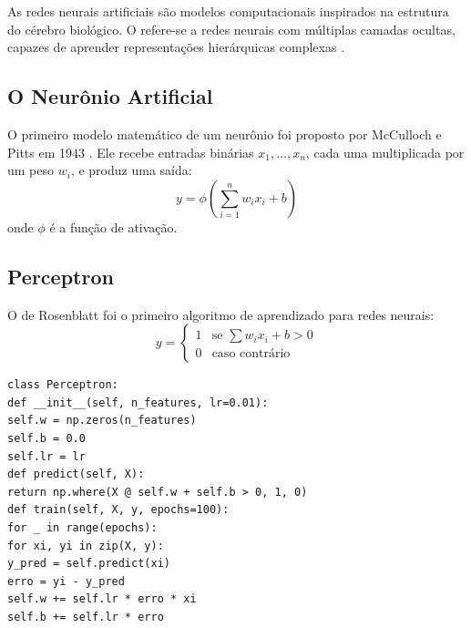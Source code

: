 As redes neurais artificiais são modelos computacionais inspirados na
estrutura do cérebro biológico. O  refere-se a
redes neurais com múltiplas camadas ocultas, capazes de aprender
representações hierárquicas complexas \cite{goodfellow2016deep,
lecun2015deep}.
\subsection{O Neurônio Artificial}
\begin{definicao}
O primeiro modelo matemático de um neurônio foi proposto por McCulloch e
Pitts em 1943 \cite{mcculloch1943logical}. Ele recebe entradas binárias
$x_1, \ldots, x_n$, cada uma multiplicada por um peso $w_i$, e produz uma
saída:
\[y = \phi\left(\sum_{i=1}^n w_i x_i + b\right)
\]
onde $\phi$ é a função de ativação.
\end{definicao}
\subsection{Perceptron}
O  de Rosenblatt \cite{rosenblatt1958perceptron} foi
o primeiro algoritmo de aprendizado para redes neurais:
\[y = \begin{cases}
1 & \text{se } \sum w_i x_i + b > 0 \\
0 & \text{caso contrário}
\end{cases}
\]
\begin{lstlisting}[style=pythonstyle]
class Perceptron:
def __init__(self, n_features, lr=0.01):
self.w = np.zeros(n_features)
self.b = 0.0
self.lr = lr
def predict(self, X):
return np.where(X @ self.w + self.b > 0, 1, 0)
def train(self, X, y, epochs=100):
for _ in range(epochs):
for xi, yi in zip(X, y):
y_pred = self.predict(xi)
erro = yi - y_pred
self.w += self.lr * erro * xi
self.b += self.lr * erro
\end{lstlisting}
